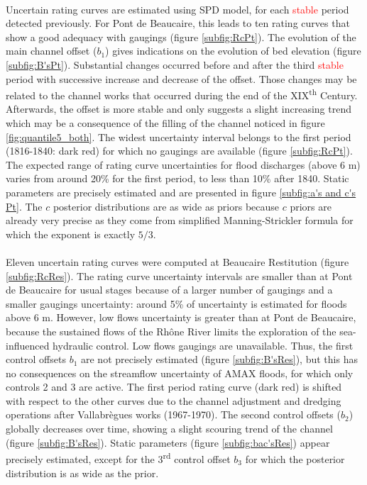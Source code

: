 \documentclass[11pt]{article}
\begin{document}
    \paragraph{}
    Uncertain rating curves are estimated using \citet{mansanarez_shift_2019} SPD model, for each \textcolor{red}{stable} period detected previously. For Pont de Beaucaire, this leads to ten rating curves that show a good adequacy with gaugings (figure \ref{subfig:RcPt}). The evolution of the main channel offset ($b_1$) gives indications on the evolution of bed elevation (figure \ref{subfig:B'sPt}). Substantial changes occurred before and after the third \textcolor{red}{stable} period with successive increase and decrease of the offset. Those changes may be related to the channel works that occurred during the end of the XIX\textsuperscript{th} Century. Afterwards, the offset is more stable and only suggests a slight increasing trend which may be a consequence of the filling of the channel noticed in figure \ref{fig:quantile5_both}. The widest uncertainty interval belongs to the first period (1816-1840: dark red) for which no gaugings are available (figure \ref{subfig:RcPt}). The expected range of rating curve uncertainties for flood discharges (above 6 m) varies from around 20\% for the first period, to less than 10\% after 1840. Static parameters are precisely estimated and are presented in figure \ref{subfig:a's and c's Pt}. The $c$ posterior distributions are as wide as priors because $c$ priors are already very precise as they come from simplified Manning-Strickler formula for which the exponent is exactly $5/3$.
    
    \paragraph{}
    Eleven uncertain rating curves were computed at Beaucaire Restitution (figure \ref{subfig:RcRes}). The rating curve uncertainty intervals are smaller than at Pont de Beaucaire for usual stages because of a larger number of gaugings and a smaller gaugings uncertainty: around 5\% of uncertainty is estimated for floods above 6 m. However, low flows uncertainty is greater than at Pont de Beaucaire, because the sustained flows of the Rhône River limits the exploration of the sea-influenced hydraulic control. Low flows gaugings are unavailable. Thus, the first control offsets $b_1$ are not precisely estimated (figure \ref{subfig:B'sRes}), but this has no consequences on the streamflow uncertainty of AMAX floods, for which only controls 2 and 3 are active. The first period rating curve (dark red) is shifted with respect to the other curves due to the channel adjustment and dredging operations after Vallabrègues works (1967-1970). The second control offsets ($b_2$) globally decreases over time, showing a slight scouring trend of the channel (figure \ref{subfig:B'sRes}). Static parameters (figure \ref{subfig:bac'sRes}) appear precisely estimated, except for the 3\textsuperscript{rd} control offset $b_3$ for which the posterior distribution is as wide as the prior. 
        
\end{document}
